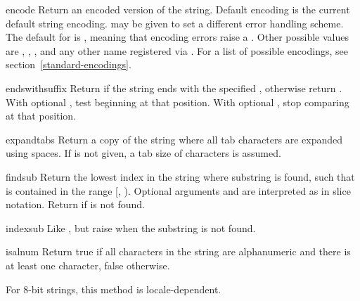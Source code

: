 \begin{methoddesc}[string]{encode}{}
Return an encoded version of the string.  Default encoding is the current
default string encoding.   may be given to set a different
error handling scheme.  The default for  is
, meaning that encoding errors raise a
.  Other possible values are ,
, , 
and any other name registered via .
For a list of possible encodings, see section~\ref{standard-encodings}.
\end{methoddesc}

\begin{methoddesc}[string]{endswith}{suffix}
Return  if the string ends with the specified ,
otherwise return .  With optional , test beginning at
that position.  With optional , stop comparing at that position.
\end{methoddesc}

\begin{methoddesc}[string]{expandtabs}{}
Return a copy of the string where all tab characters are expanded
using spaces.  If  is not given, a tab size of 
characters is assumed.
\end{methoddesc}

\begin{methoddesc}[string]{find}{sub}
Return the lowest index in the string where substring  is
found, such that  is contained in the range [,
).  Optional arguments  and  are
interpreted as in slice notation.  Return  if  is
not found.
\end{methoddesc}

\begin{methoddesc}[string]{index}{sub}
Like , but raise  when the
substring is not found.
\end{methoddesc}

\begin{methoddesc}[string]{isalnum}{}
Return true if all characters in the string are alphanumeric and there
is at least one character, false otherwise.

For 8-bit strings, this method is locale-dependent.
\end{methoddesc}

